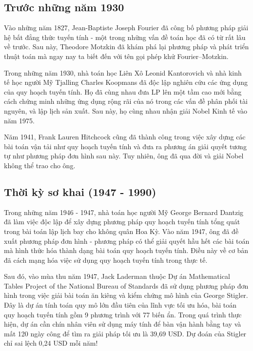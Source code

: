 \subsection{Trước những năm 1930}

Vào những năm 1827, Jean-Baptiste Joseph Fourier đã công bố phương pháp giải hệ bất đẳng thức tuyến tính - một trong những vấn đề toán học đã có từ rất lâu về trước. Sau này,  Theodore Motzkin đã khám phá lại phương pháp và phát triển thuật toán mà ngay nay ta biết đến với tên gọi phép khử Fourier–Motzkin.

Trong những năm 1930, nhà toán học Liên Xô Leonid Kantorovich và nhà kinh tế học người Mỹ Tjalling Charles Koopmans đã độc lập nghiên cứu các ứng dụng của quy hoạch tuyến tính. Họ đã cùng nhau đưa LP lên một tầm cao mới bằng cách chứng minh những ứng dụng rộng rãi của nó trong các vấn đề phân phối tài nguyên, và lập lịch sản xuất. Sau này, họ cùng nhau nhận giải Nobel Kinh tế vào năm 1975.

Năm 1941, Frank Lauren Hitchcock cũng đã thành công trong việc xây dựng các bài toán vận tải như quy hoạch tuyến tính và đưa ra phương án giải quyết tương tự như phương pháp đơn hình sau này. Tuy nhiên, ông đã qua đời và giải Nobel không thể trao cho ông.

\subsection{Thời kỳ sơ khai (1947 - 1990)}

Trong những năm 1946 - 1947, nhà toán học người Mỹ George Bernard Dantzig\footnotemark{} đã làm việc độc lập để xây dựng phương pháp quy hoạch tuyến tính tổng quát trong bài toán lập lịch bay cho không quân Hoa Kỳ. Vào năm 1947, ông đã đề xuất phương pháp đơn hình - phương pháp có thể giải quyết hầu hết các bài toán mà hình thức hóa thành dạng bài toán quy hoạch tuyến tính. Điều này về cơ bản đã cách mạng hóa việc sử dụng quy hoạch tuyến tính trong thực tế.


Sau đó, vào mùa thu năm 1947, Jack Laderman thuộc Dự án Mathematical Tables Project of the National Bureau of Standards đã sử dụng phương pháp đơn hình trong việc giải bài toán ăn kiêng\footnotemark{} và kiểm chứng mô hình của George Stigler. Đây là dự án tính toán quy mô lớn đầu tiên của lĩnh vực tối ưu hóa, bài toán quy hoạch tuyến tính gồm 9 phương trình với 77 biến ẩn. Trong quá trình thực hiện, dự án cần chín nhân viên sử dụng máy tính để bàn vận hành bằng tay và mất 120 ngày công để tìm ra giải pháp tối ưu là 39,69 USD. Dự đoán của Stigler chỉ sai lệch 0,24 USD mỗi năm!

